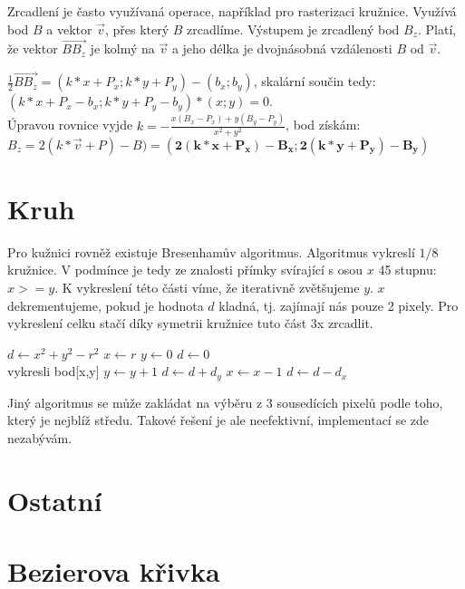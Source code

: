 \documentclass[a4paper,12pt]{book}
\begin{document}
Zrcadlení je často využívaná operace, například pro rasterizaci kružnice.
Využívá bod $B$ a vektor $\vec{v}$, přes který $B$ zrcadlíme. Výstupem je zrcadlený bod $B_{z}$.
Platí, že vektor $\overrightarrow{BB_{z}}$ je kolmý na $\vec{v}$ a jeho délka je dvojnásobná vzdálenosti $B$ od $\vec{v}$.


$\frac{1}{2} \overrightarrow{BB_{z}} = (k*x+P_x;k*y+P_y)-(b_x;b_y)$, skalární součin tedy:
\\$(k*x+P_x-b_x;k*y+P_y-b_y)*(x;y)=0$.
\\Úpravou rovnice vyjde $k = -\frac{x(B_x-P_x)+y(B_y-P_y)}{x^2+y^2}$, bod získám:
$B_z = 2(k*\vec{v}+P)-B) = \bm{(2(k*x+P_x)-B_x;2(k*y+P_y)-B_y)}$







\section{Kruh} %

Pro kužnici rovněž existuje Bresenhamův algoritmus. Algoritmus vykreslí $1/8$ kružnice. V podmínce je tedy ze znalosti přímky svírající s osou $x$ 45 stupnu: $x>=y$. K vykreslení této části víme, že iterativně zvětšujeme $y$. $x$ dekrementujeme, pokud je hodnota $d$ kladná, tj. zajímají nás pouze 2 pixely. %
Pro vykreslení celku stačí díky symetrii kružnice tuto část 3x zrcadlit.




\begin{algorithmic}
\State $d \gets x^2 + y^2 - r^2$
\State $x \gets r$
\State $y \gets 0$
\State $d \gets 0$
\\vykresli bod[x,y]
\State $y \gets y + 1$
\State $d \gets d + d_y$
    \State $x \gets x - 1$
    \State $d \gets d - d_x$
\EndIf 
\EndWhile
\end{algorithmic}

Jiný algoritmus se může zakládat na výběru z 3 sousedících pixelů podle toho, který je nejblíž středu. Takové řešení je ale neefektivní, implementací se zde nezabývám.






\section{Ostatní}

\section{Bezierova křivka}
\end{document}
